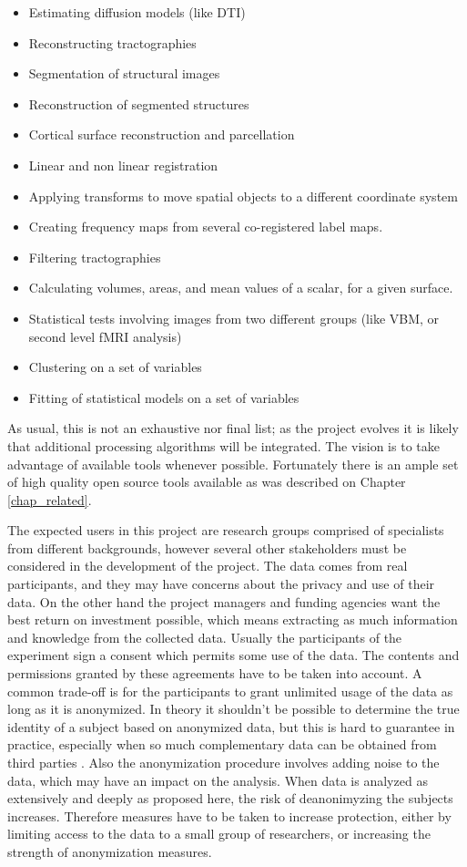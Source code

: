 \begin{itemize}
\item Estimating diffusion models (like DTI)
\item Reconstructing tractographies
\item Segmentation of structural images
\item Reconstruction of segmented structures
\item Cortical surface reconstruction and parcellation
\item Linear and non linear registration
\item Applying transforms to move spatial objects to a different coordinate system
\item Creating frequency maps from several co-registered label maps.
\item Filtering tractographies
\item Calculating volumes, areas, and mean values of a scalar, for a given surface.
\item Statistical tests involving images from two different groups (like VBM, or second level fMRI analysis)
\item Clustering on a set of variables
\item Fitting of statistical models on a set of variables
\end{itemize}

As usual, this is not an exhaustive nor final list; as the project evolves it is likely that additional processing algorithms will be integrated. The vision is to take advantage of available tools whenever possible. Fortunately there is an ample set of high quality open source tools available as was described on Chapter \ref{chap_related}.


The expected users in this project are research groups comprised of specialists from different backgrounds, however several other stakeholders must be considered in the development of the project. The data comes from real participants, and they may have concerns about the privacy and use of their data. On the other hand the project managers and funding agencies want the best return on investment possible, which means extracting as much information and knowledge from the collected data. Usually the participants of the experiment sign a consent which permits some use of the data. The contents and permissions granted by these agreements have to be taken into account. A common trade-off is for the participants to grant unlimited usage of the data as long as it is anonymized. In theory it shouldn't be possible to determine the true identity of a subject based on anonymized data, but this is hard to guarantee in practice, especially when so much complementary data can be obtained from third parties \autocite{singel_netflix_2009}. Also the anonymization procedure involves adding noise to the data, which may have an impact on the analysis. When data is analyzed as extensively and deeply as proposed here, the risk of deanonimyzing the subjects increases. Therefore measures have to be taken to increase protection, either by limiting access to the data to a small group of researchers, or increasing the strength of anonymization measures. 

